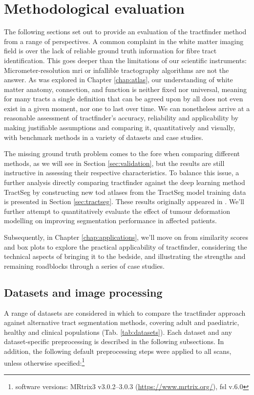 \chapter{Methodological evaluation}\label{chap:eval}

The following sections set out to provide an evaluation of the tractfinder method from a range of perspectives.
A common complaint in the white matter imaging field is over the lack of reliable ground truth information for fibre tract identification.
This goes deeper than the limitations of our scientific instruments:
Micrometer-resolution \gls{mri} or infallible tractography algorithms are not the answer.
As was explored in Chapter \ref{chap:atlas}, our understanding of white matter anatomy, connection, and function is neither fixed nor universal, meaning for many tracts a single definition that can be agreed upon by all does not even exist in a given moment, nor one to last over time.
We can nonetheless arrive at a reasonable assessment of tractfinder's accuracy, reliability and applicability by making justifiable assumptions and comparing it, quantitatively and visually, with benchmark methods in a variety of datasets and case studies.

The missing ground truth problem comes to the fore when comparing different methods, as we will see in Section \ref{sec:validation}, but the results are still instructive in assessing their respective characteristics.
To balance this issue, a further analysis directly comparing tractfinder against the deep learning method TractSeg by constructing new \gls{tod} atlases from the TractSeg model training data is presented in Section \ref{sec:tractseg}.
These results originally appeared in \textcite{Young2024}.
We'll further attempt to quantitatively evaluate the effect of tumour deformation modelling on improving segmentation performance in affected patients.

Subsequently, in Chapter \ref{chap:applications}, we'll move on from similarity scores and box plots to explore the practical applicability of tractfinder, considering the technical aspects of bringing it to the bedside, and illustrating the strengths and remaining roadblocks through a series of case studies.

\section{Datasets and image processing}
\label{sec:data}

A range of datasets are considered in which to compare the tractfinder approach against alternative tract segmentation methods, covering adult and paediatric, healthy and clinical populations (Tab. \ref{tab:datasets}).
Each dataset and any dataset-specific preprocessing is described in the following subsections.
In addition, the following default preprocessing steps were applied to all scans, unless otherwise specified:\footnote[2]{software versions: MRtrix3 v3.0.2--3.0.3 (\url{https://www.mrtrix.org/}), \gls{fsl} v.6.0}

